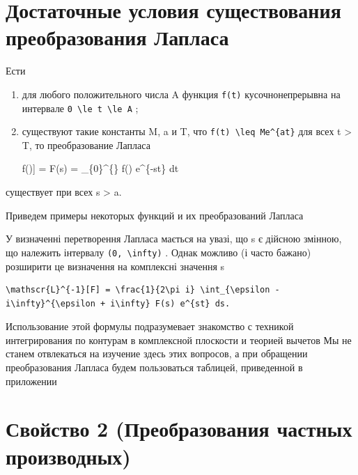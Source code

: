 \documentclass[
  ukrainian,
]{article}
\begin{document}
\section{Достаточные условия существования преобразования
Лапласа}\label{ux434ux43eux441ux442ux430ux442ux43eux447ux43dux44bux435-ux443ux441ux43bux43eux432ux438ux44f-ux441ux443ux449ux435ux441ux442ux432ux43eux432ux430ux43dux438ux44f-ux43fux440ux435ux43eux431ux440ux430ux437ux43eux432ux430ux43dux438ux44f-ux43bux430ux43fux43bux430ux441ux430}

Ести

\begin{enumerate}
\def\labelenumi{\arabic{enumi})}
\item
  для любого положительного числа A функция \texttt{f(t)}
  кусочнонепрерывна на интервале
  \texttt{0\ \textbackslash{}le\ t\ \textbackslash{}le\ A} ;
\item
  существуют такие константы M, a и T, что
  \texttt{\textbar{}f(t)\textbar{}\ \textbackslash{}leq\ Me\^{}\{at\}}
  для всех t \textgreater{} T, то преобразование Лапласа

  \mathscr{L}{[}f(\ell){]} = F(s) = \int\_\{0\}\^{}\{\infty\} f(\ell)
  e\^{}\{-st\} dt
\end{enumerate}

существует при всех s \textgreater{} a.

Приведем примеры некоторых функций и их преобразований Лапласа

У визначенні перетворення Лапласа мається на увазі, що s є дійсною
змінною, що належить інтервалу \texttt{(0,\ \textbackslash{}infty)} .
Однак можливо (і часто бажано) розширити це визначення на комплексні
значення s

\begin{verbatim}
\mathscr{L}^{-1}[F] = \frac{1}{2\pi i} \int_{\epsilon - i\infty}^{\epsilon + i\infty} F(s) e^{st} ds.
\end{verbatim}

Использование этой формулы подразумевает знакомство с техникой
интегрирования по контурам в комплексной плоскости и теорией вычетов Мы
не станем отвлекаться на изучение здесь этих вопросов, а при обращении
преобразования Лапласа будем пользоваться таблицей, приведенной в
приложении

\section{Свойство 2 (Преобразования частных
производных)}\label{ux441ux432ux43eux439ux441ux442ux432ux43e-2-ux43fux440ux435ux43eux431ux440ux430ux437ux43eux432ux430ux43dux438ux44f-ux447ux430ux441ux442ux43dux44bux445-ux43fux440ux43eux438ux437ux432ux43eux434ux43dux44bux445}
\end{document}
